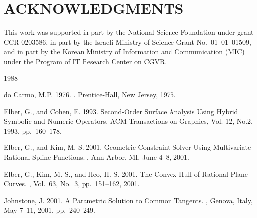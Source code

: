\documentclass{acmsiggraph}
\begin{document}
\section*{ACKNOWLEDGMENTS}

This work was supported in part by the National Science Foundation under 
grant CCR-0203586, in part by the Israeli Ministry of Science
Grant No.~01--01--01509, and in part by
the Korean Ministry of Information and Communication (MIC) under
the Program of IT Research Center on CGVR.



\begin{thebibliography}{\protect{}1988}


{\sc do Carmo, M.P. 1976.}
.
\newblock Prentice-Hall, New Jersey, 1976.

{\sc Elber, G., and Cohen, E. 1993.}
\newblock Second-Order Surface Analysis Using Hybrid Symbolic and
Numeric Operators.
\newblock ACM Transactions on Graphics, Vol. 12, No.2, 1993, 
pp.~160--178.

{\sc Elber, G., and Kim, M.-S. 2001.}
\newblock Geometric Constraint Solver
Using Multivariate Rational Spline Functions.
,
Ann Arbor, MI, June 4--8, 2001.

{\sc Elber, G., Kim, M.-S., and Heo, H.-S. 2001.}
\newblock The Convex Hull of Rational Plane Curves.
, Vol.~63, No.~3, pp.~151--162, 2001.


{\sc Johnstone, J. 2001.}
\newblock A Parametric Solution to Common Tangents.
,
Genova, Italy, May 7--11, 2001, pp.~240--249.


\end{thebibliography}
\end{document}
